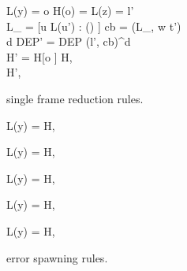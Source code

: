 \begin{figure}
  \RuleSpace{}

  {L(y) = o \andalso H(o) =  \andalso L(z) = l' \\
  L_{} = [u \mapsto L(u') : () \in {}]
  \andalso cb = (L_{}, w \Rightarrow t') \\
  d \andalso DEP' = DEP \cup (l', cb)^d \\
  H' = H[o \mapsto {}] }
  { H,  \\ \FRedTo \;
  H',  }
  \caption{\RACL{} single frame reduction rules.}
  \label{fig:frame_red_rules}
\end{figure}

\begin{figure}
  {L(y) = \NullVal}
  {H,  \; \FRedTo \; \Error}

  \RuleSpace{}

  {L(y) = \NullVal}
  {H,  \; \FRedTo \; \Error}

  \RuleSpace{}

  {L(y) = \NullVal}
  {H,  \; \FRedTo \; \Error}

  \RuleSpace{}

  {L(y) = \NullVal}
  {H,  \; \FRedTo \; \Error}

  \RuleSpace{}

  {L(y) = \NullVal}
  {H,   \\ \FRedTo \; \Error}
  \caption{\RACL{} error spawning rules.}
  \label{fig:error_red_rules}
\end{figure}

